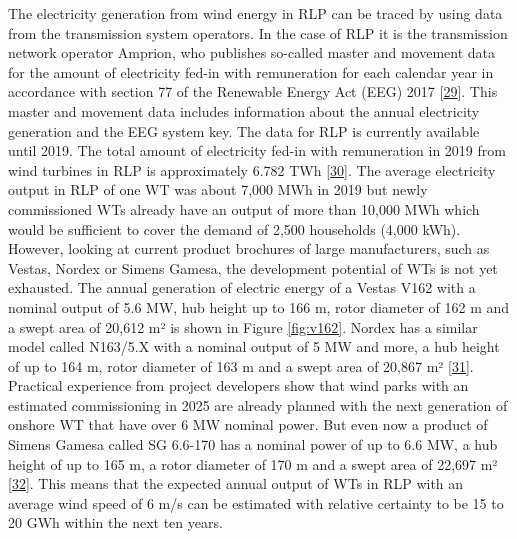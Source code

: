 \documentclass[a4paper,11pt]{article}
\begin{document}
The electricity generation from wind energy in RLP can be traced by using data from the transmission system operators. In the case of RLP it is the transmission network operator Amprion, who publishes so-called master and movement data for the amount of electricity fed-in with remuneration for each calendar year in accordance with section 77 of the Renewable Energy Act (EEG) 2017 {[}\protect\hyperlink{ref-Bundesgestzblatt.2017}{29}{]}. This master and movement data includes information about the annual electricity generation and the EEG system key. The data for RLP is currently available until 2019. The total amount of electricity fed-in with remuneration in 2019 from wind turbines in RLP is approximately 6.782 TWh {[}\protect\hyperlink{ref-EnergieagenturRheinlandPfalz.2019}{30}{]}. The average electricity output in RLP of one WT was about 7,000 MWh in 2019 but newly commissioned WTs already have an output of more than 10,000 MWh which would be sufficient to cover the demand of 2,500 households (4,000 kWh). However, looking at current product brochures of large manufacturers, such as Vestas, Nordex or Simens Gamesa, the development potential of WTs is not yet exhausted. The annual generation of electric energy of a Vestas V162 with a nominal output of 5.6 MW, hub height up to 166 m, rotor diameter of 162 m and a swept area of 20,612 m² is shown in Figure \ref{fig:v162}. Nordex has a similar model called N163/5.X with a nominal output of 5 MW and more, a hub height of up to 164 m, rotor diameter of 163 m and a swept area of 20,867 m² {[}\protect\hyperlink{ref-Nordex.2021}{31}{]}. Practical experience from project developers show that wind parks with an estimated commissioning in 2025 are already planned with the next generation of onshore WT that have over 6 MW nominal power. But even now a product of Simens Gamesa called SG 6.6-170 has a nominal power of up to 6.6 MW, a hub height of up to 165 m, a rotor diameter of 170 m and a swept area of 22,697 m² {[}\protect\hyperlink{ref-SimensGamesa.2021}{32}{]}. This means that the expected annual output of WTs in RLP with an average wind speed of 6 m/s can be estimated with relative certainty to be 15 to 20 GWh within the next ten years.
\end{document}
